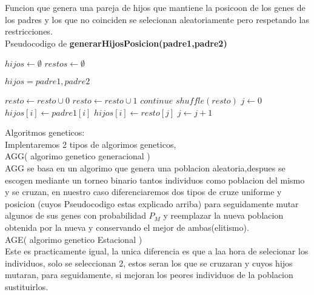 Funcion que genera una pareja de hijos que mantiene la posicoon de los genes de los padres y los que no coinciden
se selecionan aleatoriamente pero respetando las restricciones.\\
Pseudocodigo de \textbf{generarHijosPosicion(padre1,padre2)}
\begin{algorithm}[H]
  \begin{algorithmic}[1]
      \State $hijos \gets \emptyset$
      \State $restos \gets \emptyset$

        \State $hijos = padre1,padre2$  
      \EndIf

            \State $resto \gets resto \cup 0$
            \State $resto \gets resto \cup 1$
          \EndIf
        \Else
          \State$continue$
        \EndIf
      \EndFor
      \State $shuffle(resto)$
      \State $j \gets 0$
            \State $hijos[i] \gets padre1[i] $
        \Else
            \State $hijos[i] \gets resto[j] $
            \State $j \gets j +1$
        \EndIf
      \EndFor

      \State {}
    \EndFunction
  \end{algorithmic}
\end{algorithm}


Algoritmos geneticos:\\
Implentaremos 2 tipos de algorimos geneticos,\\
AGG( algorimo genetico generacional )\\
AGG se basa en un algorimo que genera una poblacion aleatoria,despues se escogen mediante un torneo binario tantos individuos como
poblacion del mismo y se cruzan, en nuestro caso diferenciaremos dos tipos de cruze uniforme y posicion (cuyos Pseudocodigo estas explicado arriba)
para seguidamente mutar algunos de sus genes con probabilidad $P_M$ y reemplazar la nueva poblacion obtenida por la nueva y conservando el mejor de ambas(elitismo).\\
AGE( algorimo genetico Estacional )\\  
Este es practicamente igual, la unica diferencia es que a laa hora de selecionar los individuos, solo se seleccionan 2, estos seran los que se cruzaran y cuyos hijos mutaran, 
para seguidamente, si mejoran los peores individuos de la poblacion sustituirlos.



